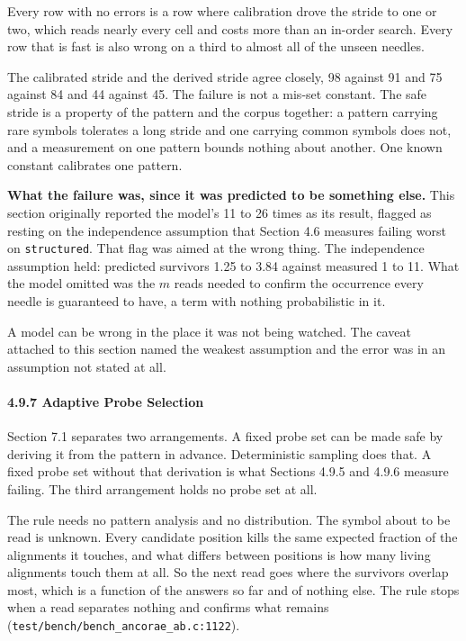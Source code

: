Every row with no errors is a row where calibration drove the stride to one or two, which reads nearly every cell and costs more than an in-order search. Every row that is fast is also wrong on a third to almost all of the unseen needles.

The calibrated stride and the derived stride agree closely, 98 against 91 and 75 against 84 and 44 against 45. The failure is not a mis-set constant. The safe stride is a property of the pattern and the corpus together: a pattern carrying rare symbols tolerates a long stride and one carrying common symbols does not, and a measurement on one pattern bounds nothing about another. One known constant calibrates one pattern.

\noindent\textbf{What the failure was, since it was predicted to be something else.} This section originally reported the model's 11 to 26 times as its result, flagged as resting on the independence assumption that Section 4.6 measures failing worst on \texttt{structured}. That flag was aimed at the wrong thing. The independence assumption held: predicted survivors 1.25 to 3.84 against measured 1 to 11. What the model omitted was the \(m\) reads needed to confirm the occurrence every needle is guaranteed to have, a term with nothing probabilistic in it.

A model can be wrong in the place it was not being watched. The caveat attached to this section named the weakest assumption and the error was in an assumption not stated at all.

\paragraph{4.9.7 Adaptive Probe Selection}

Section 7.1 separates two arrangements. A fixed probe set can be made safe by deriving it from the pattern in advance. Deterministic sampling does that. A fixed probe set without that derivation is what Sections 4.9.5 and 4.9.6 measure failing. The third arrangement holds no probe set at all.

The rule needs no pattern analysis and no distribution. The symbol about to be read is unknown. Every candidate position kills the same expected fraction of the alignments it touches, and what differs between positions is how many living alignments touch them at all. So the next read goes where the survivors overlap most, which is a function of the answers so far and of nothing else. The rule stops when a read separates nothing and confirms what remains (\texttt{test/\allowbreak{}bench/\allowbreak{}bench\_\allowbreak{}ancorae\_\allowbreak{}ab.\allowbreak{}c:1122}).

